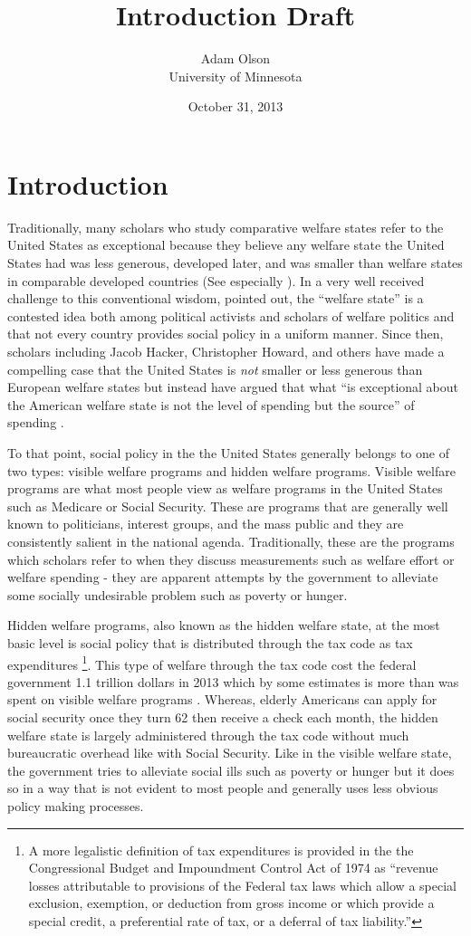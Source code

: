 \documentclass[12pt]{article}
\author{Adam Olson\\University of Minnesota}
\title{Introduction Draft}
\date{October 31, 2013}
\makeatletter
\renewcommand{\maketitle}{\bgroup\setlength{\parindent}{0pt}
\begin{flushleft}
  \textbf{\@title}

  \@author
\end{flushleft}\egroup
}
\makeatother
\begin{document}
\maketitle

\section{Introduction}
Traditionally, many scholars who study comparative welfare states refer to the United States as exceptional because they believe any welfare state the United States had was less generous, developed later, and was smaller than welfare states in comparable developed countries (See especially \citealt{andersen1990}). In a very well received challenge to this conventional wisdom, \citet{hacker2002} pointed out, the ``welfare state'' is a contested idea both among political activists and scholars of welfare politics and that not every country provides social policy in a uniform manner. Since then, scholars including Jacob Hacker, Christopher Howard, and others have made a compelling case that the United States is \emph{not} smaller or less generous than European welfare states but instead have argued that what ``is exceptional about the American welfare state is not the level of spending but the source'' of spending \citep[pg. 7]{hacker2002}.

To that point, social policy in the the United States generally belongs to one of two types: visible welfare programs and hidden welfare programs. Visible welfare programs are what most people view as welfare programs in the United States such as Medicare or Social Security. These are programs that are generally well known to politicians, interest groups, and the mass public and they are consistently salient in the national agenda. Traditionally, these are the programs which scholars refer to when they discuss measurements such as welfare effort or welfare spending - they are apparent attempts by the government to alleviate some socially undesirable problem such as poverty or hunger.

Hidden welfare programs, also known as the hidden welfare state, at the most basic level is social policy that is distributed through the tax code as tax expenditures \citep{howard1997}\footnote{A more legalistic definition of tax expenditures is provided in the the Congressional Budget and Impoundment Control Act of 1974 as ``revenue losses attributable to provisions of the Federal tax laws which allow a special exclusion, exemption, or deduction from gross income or which provide a special credit, a preferential rate of tax, or a deferral of tax liability.''}.  This type of welfare through the tax code cost the federal government 1.1 trillion dollars in 2013 which by some estimates is more than was spent on visible welfare programs \citep{omb2013}. Whereas, elderly Americans can apply for social security once they turn 62  then receive a check each month, the hidden welfare state is largely administered through the tax code without much bureaucratic overhead like with Social Security. Like in the visible welfare state, the government tries to alleviate social ills such as poverty or hunger but it does so in a way that is not evident to most people and generally uses less obvious policy making processes.
\end{document}
